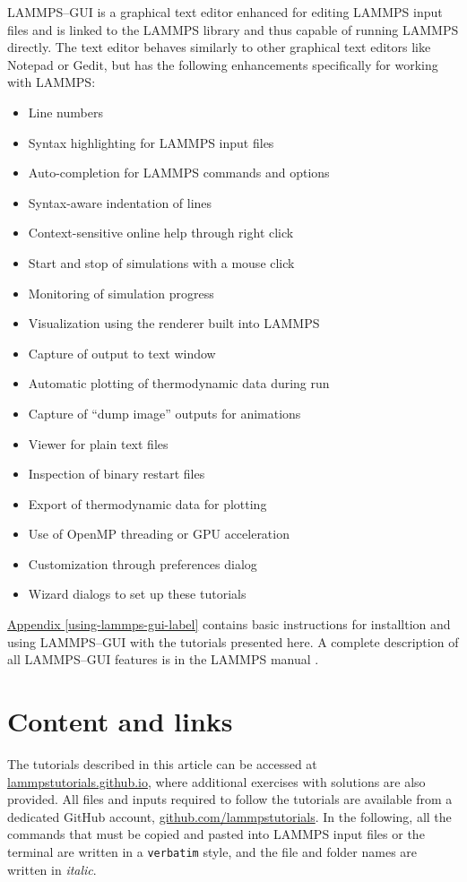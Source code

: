 \documentclass[9pt,tutorial]{livecoms}
\begin{document}
LAMMPS--GUI is a graphical text editor enhanced for editing LAMMPS input
files and is linked to the LAMMPS library and thus capable of running
LAMMPS directly.  The text editor behaves similarly to other graphical
text editors like Notepad or Gedit, but has the following enhancements
specifically for working with LAMMPS:
\begin{itemize}
\item Line numbers
\item Syntax highlighting for LAMMPS input files
\item Auto-completion for LAMMPS commands and options
\item Syntax-aware indentation of lines
\item Context-sensitive online help through right click
\item Start and stop of simulations with a mouse click
\item Monitoring of simulation progress
\item Visualization using the renderer built into LAMMPS
\item Capture of output to text window
\item Automatic plotting of thermodynamic data during run
\item Capture of ``dump image'' outputs for animations
\item Viewer for plain text files
\item Inspection of binary restart files
\item Export of thermodynamic data for plotting
\item Use of OpenMP threading or GPU acceleration
\item Customization through preferences dialog
\item Wizard dialogs to set up these tutorials
\end{itemize}

\hyperref[using-lammps-gui]{Appendix \ref{using-lammps-gui-label}}
contains basic instructions for installtion and using LAMMPS--GUI with
the tutorials presented here.  A complete description of all LAMMPS--GUI
features is in the LAMMPS manual \cite{lammps_gui_docs}.

\section{Content and links}

The tutorials described in this article can be accessed at
\href{https://lammpstutorials.github.io}{lammpstutorials.github.io},
where additional exercises with solutions are also provided. All files
and inputs required to follow the tutorials are available from a
dedicated GitHub account,
\href{https://github.com/lammpstutorials}{github.com/lammpstutorials}. In
the following, all the commands that must be copied and pasted into
LAMMPS input files or the terminal are written in a \verb+verbatim+
style, and the file and folder names are written in \textit{italic}.
\end{document}
